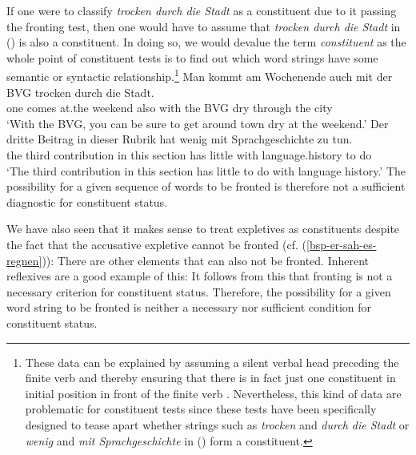 If one were to classify \emph{trocken durch die Stadt} as a constituent due to it passing the fronting test, then one would have
to assume that \emph{trocken durch die Stadt} in () is also a constituent. In doing so, we would devalue the term \emph{constituent}
as the whole point of constituent tests is to find out which word strings have some semantic or syntactic relationship.\footnote{%
  These data can be explained by assuming a silent verbal head preceding the finite verb and thereby ensuring
  that there is in fact just one constituent in initial position in front of the finite verb \citep{Mueller2005d,MuellerGS}.
  Nevertheless, this kind of data are problematic for constituent tests since these tests have been specifically designed to tease apart
  whether strings such as \emph{trocken} and \emph{durch die Stadt} or \emph{wenig} and \emph{mit Sprachgeschichte} in () form a constituent.%
}
\eal
\ex 
\gll Man kommt am Wochenende auch mit der BVG trocken durch die Stadt.\\
     one comes at.the weekend also with the BVG dry through the city\\
\glt `With the BVG, you can be sure to get around town dry at the weekend.'
\ex 
\gll Der dritte Beitrag in dieser Rubrik hat wenig mit Sprachgeschichte zu tun.\\
     the third  contribution in this section  has little with language.history to do\\
\glt `The third contribution in this section has little to do with language history.'
\zl
The possibility for a given sequence of words to be fronted is therefore not a sufficient diagnostic for constituent status.

We have also seen that it makes sense to treat expletives as constituents despite the fact that the accusative expletive cannot be fronted 
(cf. (\ref{bsp-er-sah-es-regnen})):
\eal
{}
\zl
There are other elements that can also not be fronted. Inherent reflexives are a good example of this:
\eal
{}
\zl
It follows from this that fronting is not a necessary criterion for constituent status. Therefore, the possibility for a given word string to
be fronted is neither a necessary nor sufficient condition for constituent status.

